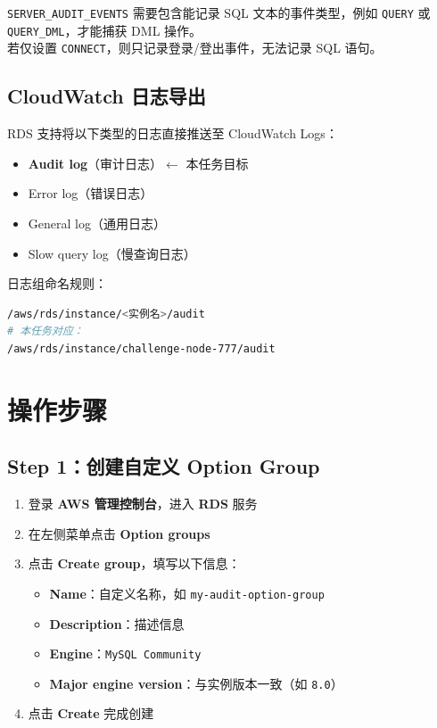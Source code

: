 \documentclass[12pt, a4paper]{article}
\begin{document}
\vspace{0.5em}
\begin{tcolorbox}[colback=warnbg, colframe=warnframe, title={\textbf{注意}}]
\texttt{SERVER\_AUDIT\_EVENTS} 需要包含能记录 SQL 文本的事件类型，例如 \texttt{QUERY} 或 \texttt{QUERY\_DML}，才能捕获 DML 操作。\\
若仅设置 \texttt{CONNECT}，则只记录登录/登出事件，无法记录 SQL 语句。
\end{tcolorbox}

\subsection{CloudWatch 日志导出}

RDS 支持将以下类型的日志直接推送至 CloudWatch Logs：

\begin{itemize}
  \item \textbf{Audit log}（审计日志）$\leftarrow$ 本任务目标
  \item Error log（错误日志）
  \item General log（通用日志）
  \item Slow query log（慢查询日志）
\end{itemize}

日志组命名规则：
\begin{lstlisting}[language=bash]
/aws/rds/instance/<实例名>/audit
# 本任务对应：
/aws/rds/instance/challenge-node-777/audit
\end{lstlisting}

\section{操作步骤}

\subsection{Step 1：创建自定义 Option Group}

\begin{enumerate}[leftmargin=2em]
  \item 登录 \textbf{AWS 管理控制台}，进入 \textbf{RDS} 服务
  \item 在左侧菜单点击 \textbf{Option groups}
  \item 点击 \textbf{Create group}，填写以下信息：
  \begin{itemize}
    \item \textbf{Name}：自定义名称，如 \texttt{my-audit-option-group}
    \item \textbf{Description}：描述信息
    \item \textbf{Engine}：\texttt{MySQL Community}
    \item \textbf{Major engine version}：与实例版本一致（如 \texttt{8.0}）
  \end{itemize}
  \item 点击 \textbf{Create} 完成创建
\end{enumerate}
\end{document}
